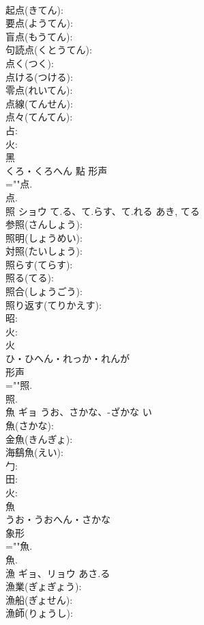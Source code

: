 \documentclass[8pt]{extreport}
\begin{document}
\begin{CJK}{UTF8}{min}
\\	起点(きてん): 
\\	要点(ようてん): 
\\	盲点(もうてん): 
\\	句読点(くとうてん): 
\\	点く(つく): 
\\	点ける(つける): 
\\	零点(れいてん): 
\\	点線(てんせん): 
\\	点々(てんてん): 
\\	占: 
\\	火: 
\\	黑	
\\	くろ・くろへん	點	形声 
\\	=""点.
\\	点.
\\	照	ショウ	て.る、て.らす、て.れる	あき, てる	
\\	参照(さんしょう): 
\\	照明(しょうめい): 
\\	対照(たいしょう): 
\\	照らす(てらす): 
\\	照る(てる): 
\\	照合(しょうごう): 
\\	照り返す(てりかえす): 
\\	昭: 
\\	火: 
\\	火	
\\	ひ・ひへん・れっか・れんが	
\\	形声 
\\	=""照.
\\	照.
\\	魚	ギョ	うお、さかな、-ざかな	い	
\\	魚(さかな): 
\\	金魚(きんぎょ): 
\\	海鷂魚(えい): 
\\	勹: 
\\	田: 
\\	火: 
\\	魚	
\\	うお・うおへん・さかな	
\\	象形 
\\	=""魚.
\\	魚.
\\	漁	ギョ、リョウ	あさ.る		
\\	漁業(ぎょぎょう): 
\\	漁船(ぎょせん): 
\\	漁師(りょうし): 

\end{CJK}
\end{document}
